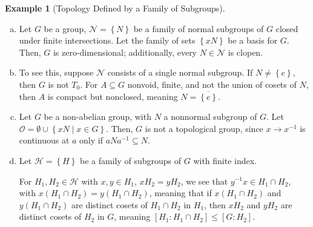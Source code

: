 \documentclass[10pt]{extarticle}
\newcommand{\set}[1]{\left\{#1\right\}}
\theoremstyle{plain}
\theoremstyle{definition}
\newtheorem*{example}{Example}
\theoremstyle{note}
\renewcommand{\newline}{\hfill\break}
\begin{document}
%
%
%
\begin{example}[Topology Defined by a Family of Subgroups]
  \begin{enumerate}[(a)]
    \item Let $G$ be a group, $\mathcal{N} = \set{N}$ be a family of normal subgroups of $G$ closed under finite intersections. Let the family of sets $\set{xN}$ be a basis for $G$. Then, $G$ is zero-dimensional; additionally, every $N\in \mathcal{N}$ is clopen.
    \item To see this, suppose $\mathcal{N}$ consists of a single normal subgroup. If $N\neq \set{e}$, then $G$ is not $T_{0}$. For $A\subseteq G$ nonvoid, finite, and not the union of cosets of $N$, then $A$ is compact but nonclosed, meaning $N = \overline{\set{e}}$.
    \item Let $G$ be a non-abelian group, with $N$ a nonnormal subgroup of $G$. Let $\mathcal{O} = \emptyset \cup \set{xN\mid x\in G}$. Then, $G$ is not a topological group, since $x\rightarrow x^{-1}$ is continuous at $a$ only if $aNa^{-1} \subseteq N$.
    \item Let $\mathcal{H} = \set{H}$ be a family of subgroups of $G$ with finite index.\newline

      For $H_1,H_2\in \mathcal{H}$ with $x,y\in H_1$, $xH_2 = yH_2$, we see that $y^{-1}x \in H_1\cap H_2$, with $x\left(H_1\cap H_2\right) = y\left(H_1\cap H_2\right)$, meaning that if $x\left(H_1\cap H_2\right)$ and $y\left(H_1\cap H_2\right)$ are distinct cosets of $H_1\cap H_2$ in $H_1$, then $xH_2$ and $yH_2$ are distinct cosets of $H_2$ in $G$, meaning $\left[H_1:H_1\cap H_2\right] \leq \left[G:H_2\right]$.
  \end{enumerate}
  
\end{example}
\end{document}
